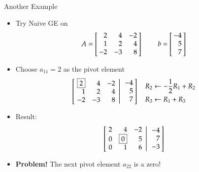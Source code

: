 \documentclass[10pt]{beamer}
\begin{document}
\begin{frame}{Another Example}
\begin{itemize}
    \item Try Naive GE on
        \begin{equation*}
            A = \left[\negthickspace\begin{array}{rrrr}  2 &  4 & -2  \\
                                                         1 &  2 &  4   \\
                                                        -2 & -3 &  8   \end{array}\negthickspace\right]
            \ \ \ \ \ \ \ \ \
            b = \left[\negthickspace\begin{array}{r} -4 \\  5 \\ 7 \end{array}\negthickspace\right]
        \end{equation*}
        \item Choose $a_{11}=2$ as the pivot element
\begin{equation*}
    \left[
           \left.\negthickspace\begin{array}{rrrr}  \boxed{2} &  4 & -2  \\
                                                    1 &  2 &  4  \\
                                                   -2 & -3 &  8  \end{array}
           \right|\begin{array}{r} -4 \\  5 \\ 7  \end{array}\negthickspace\right]
           \quad \begin{aligned}
                       &R_2 \leftarrow-\frac{1}{2}R_1 + R_2 \\
         &R_3 \leftarrow R_1 + R_3
           \end{aligned}
\end{equation*}
    \item Result: 
        \begin{equation*}
        \left[\left.\negthickspace\begin{array}{rrrr}  2 &  4 & -2 \\
                                                        0 &  \boxed{0} &  5 \\
                                                        0 &  1 &  6  \end{array}
               \right|\begin{array}{r} -4 \\ 7 \\ -3 \end{array}\negthickspace\right]
    \end{equation*}
    \item \textbf{Problem!} The next pivot element $a_{22}$  is a zero!
    \end{itemize}
\end{frame}
\end{document}
